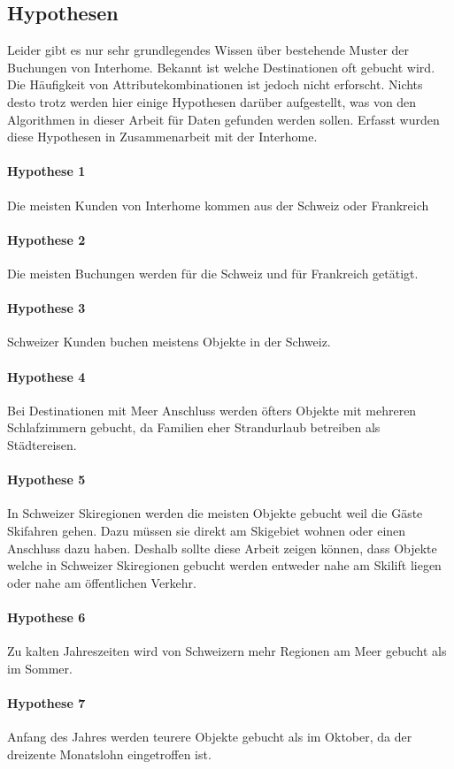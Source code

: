 \subsection{Hypothesen}
\label{sec:einleitung:ziel:hypothesen}
Leider gibt es nur sehr grundlegendes Wissen über bestehende Muster der Buchungen von Interhome. Bekannt ist welche Destinationen oft gebucht wird. Die Häufigkeit von Attributekombinationen ist jedoch nicht erforscht. Nichts desto trotz werden hier einige Hypothesen darüber aufgestellt, was von den Algorithmen in dieser Arbeit für Daten gefunden werden sollen. Erfasst wurden diese Hypothesen in Zusammenarbeit mit der Interhome.

\paragraph{Hypothese 1} Die meisten Kunden von Interhome kommen aus der Schweiz oder Frankreich
\paragraph{Hypothese 2} Die meisten Buchungen werden für die Schweiz und für Frankreich getätigt.
\paragraph{Hypothese 3} Schweizer Kunden buchen meistens Objekte in der Schweiz.
\paragraph{Hypothese 4} Bei Destinationen mit Meer Anschluss werden öfters Objekte mit mehreren Schlafzimmern gebucht, da Familien eher Strandurlaub betreiben als Städtereisen.
\paragraph{Hypothese 5} In Schweizer Skiregionen werden die meisten Objekte gebucht weil die Gäste Skifahren gehen. Dazu müssen sie direkt am Skigebiet wohnen oder einen Anschluss dazu haben. Deshalb sollte diese Arbeit zeigen können, dass Objekte welche in Schweizer Skiregionen gebucht werden entweder nahe am Skilift liegen oder nahe am öffentlichen Verkehr.
\paragraph{Hypothese 6} Zu kalten Jahreszeiten wird von Schweizern mehr Regionen am Meer gebucht als im Sommer.
\paragraph{Hypothese 7} Anfang des Jahres werden teurere Objekte gebucht als im Oktober, da der dreizente Monatslohn eingetroffen ist.

